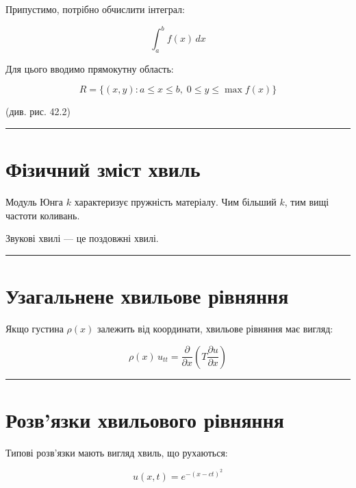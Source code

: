 \documentclass[
  ukrainian,
]{article}
\begin{document}
Припустимо, потрібно обчислити інтеграл:

\[
\int_a^b f(x)\,dx
\]

Для цього вводимо прямокутну область:

\[
R = \{(x,y): a \le x \le b,\; 0 \le y \le \max f(x)\}
\]

(див. рис. 42.2)

\begin{center}\rule{0.5\linewidth}{0.5pt}\end{center}

\section{Фізичний зміст
хвиль}\label{ux444ux456ux437ux438ux447ux43dux438ux439-ux437ux43cux456ux441ux442-ux445ux432ux438ux43bux44c}

Модуль Юнга \(k\) характеризує пружність матеріалу. Чим більший \(k\),
тим вищі частоти коливань.

Звукові хвилі --- це поздовжні хвилі.

\begin{center}\rule{0.5\linewidth}{0.5pt}\end{center}

\section{Узагальнене хвильове
рівняння}\label{ux443ux437ux430ux433ux430ux43bux44cux43dux435ux43dux435-ux445ux432ux438ux43bux44cux43eux432ux435-ux440ux456ux432ux43dux44fux43dux43dux44f}

Якщо густина \(\rho(x)\) залежить від координати, хвильове рівняння має
вигляд:

\[
\rho(x)\,u_{tt} = \frac{\partial}{\partial x}\left( T \frac{\partial u}{\partial x} \right)
\]

\begin{center}\rule{0.5\linewidth}{0.5pt}\end{center}

\section{Розв'язки хвильового
рівняння}\label{ux440ux43eux437ux432ux44fux437ux43aux438-ux445ux432ux438ux43bux44cux43eux432ux43eux433ux43e-ux440ux456ux432ux43dux44fux43dux43dux44f}

Типові розв'язки мають вигляд хвиль, що рухаються:

\[
u(x,t) = e^{-(x - ct)^2}
\]
\end{document}
